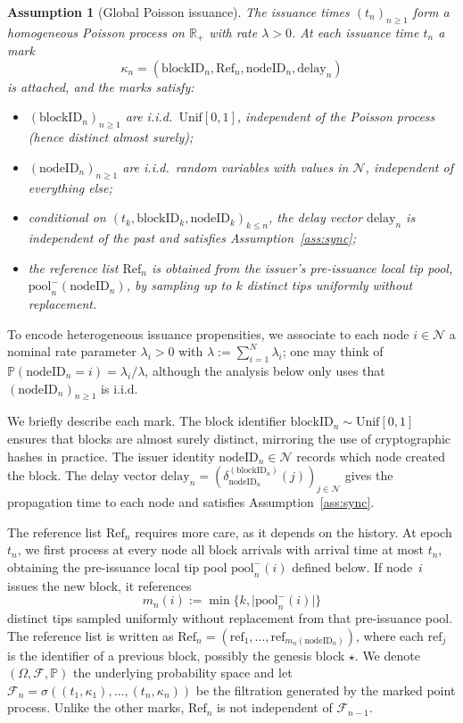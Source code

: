 \documentclass[a4paper,12pt,oneside,reqno]{amsart}
\newcommand{\Nodes}{{\mathcal N}}
\newcommand{\blockID}{\mathrm{blockID}}
\newcommand{\nodeID}{\mathrm{nodeID}}
\newcommand{\blockDelay}{\mathrm{delay}}
\renewcommand{\P}{{\mathbb P}}
\newcommand{\F}{{\mathcal F}}
\newcommand{\1}{{\mathbf 1}}
\newcommand{\pool}{\mathrm{pool}}
\newcommand{\delay}{{\delta}}
\newcommand{\refBlock}{\mathrm{Ref}}
\renewcommand{\r}{\mathrm{ref}}
\newtheorem{ass}[theo]{Assumption}
\begin{document}
\begin{ass}[Global Poisson issuance]\label{ass:poisson}
The issuance times $(t_n)_{n\ge1}$ form a homogeneous Poisson process on $\mathbb{R}_+$ with rate $\lambda>0$. At each issuance time $t_n$ a mark
\[
\kappa_n=(\blockID_n,\refBlock_n,\nodeID_n,\blockDelay_n)
\]
is attached, and the marks satisfy:
\begin{itemize}
    \item $(\blockID_n)_{n\ge1}$ are i.i.d.\ $\mathrm{Unif}[0,1]$, independent of the Poisson process (hence distinct almost surely);
    \item $(\nodeID_n)_{n\ge1}$ are i.i.d.\ random variables with values in $\Nodes$, independent of everything else;
    \item conditional on $(t_k,\blockID_k,\nodeID_k)_{k\le n}$, the delay vector $\blockDelay_n$ is independent of the past and satisfies Assumption~\ref{ass:sync};
    \item the reference list $\refBlock_n$ is obtained from the issuer's pre-issuance local tip pool, $\pool_n^{-}(\nodeID_n)$, by sampling up to $k$ distinct tips uniformly without replacement.
\end{itemize}
\end{ass}

To encode heterogeneous issuance propensities, we associate to each node $i\in\Nodes$ a nominal rate parameter $\lambda_i>0$ with $\lambda:=\sum_{i=1}^N\lambda_i$; one may think of $\P(\nodeID_n=i)=\lambda_i/\lambda$, although the analysis below only uses that $(\nodeID_n)_{n\ge1}$ is i.i.d.

We briefly describe each mark. The block identifier $\blockID_n\sim\mathrm{Unif}[0,1]$ ensures that blocks are almost surely distinct, mirroring the use of cryptographic hashes in practice. The issuer identity $\nodeID_n\in\Nodes$ records which node created the block. The delay vector $\blockDelay_n=(\delay_{\nodeID_n}^{(\blockID_n)}(j))_{j\in \Nodes}$ gives the propagation time to each node and satisfies Assumption~\ref{ass:sync}.

The reference list $\refBlock_n$ requires more care, as it depends on the history. At epoch $t_n$, we first process at every node all block arrivals with arrival time at most $t_n$, obtaining the pre-issuance local tip pool $\pool_n^{-}(i)$ defined below. If node~$i$ issues the new block, it references
\[
m_n(i):=\min\{k,\lvert \pool_n^{-}(i)\rvert\}
\]
distinct tips sampled uniformly without replacement from that pre-issuance pool. The reference list is written as $\refBlock_n = (\r_1, \ldots, \r_{m_n(\nodeID_n)})$, where each $\r_j$ is the identifier of a previous block, possibly the genesis block $\star$. We denote $(\Omega, \F, \P)$ the underlying probability space and let $\F_n =\sigma ((t_1, \kappa_1),\ldots, (t_n,\kappa_n))$ be the filtration generated by the marked point process. Unlike the other marks, $\refBlock_n$ is not independent of $\F_{n-1}$.
\end{document}
